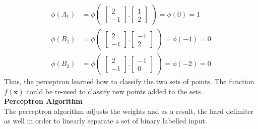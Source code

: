 \begin{align}
  \phi(A_1) &= \phi\begin{pmatrix}
    \begin{bmatrix}
      2\\
      -1
    \end{bmatrix}.\begin{bmatrix}
      1 \\
      2
    \end{bmatrix}
  \end{pmatrix} = \phi(0) = 1 \\
  \phi(B_1) &= \phi\begin{pmatrix}
    \begin{bmatrix}
      2\\
      -1
    \end{bmatrix}.\begin{bmatrix}
      -1 \\
      2
    \end{bmatrix}
  \end{pmatrix} = \phi(-4) = 0 \\
  \phi(B_2) &= \phi\begin{pmatrix}
    \begin{bmatrix}
      2\\
      -1
    \end{bmatrix}.\begin{bmatrix}
      -1 \\
      0
    \end{bmatrix}
  \end{pmatrix} = \phi(-2) = 0
\end{align}
Thus, the perceptron learned how to classify the two sets of points. The function $f(\textbf{x})$ could be re-used to classify new points added to the sets.
\vspace{5mm}
\\
\noindent\textbf{Perceptron Algorithm}\\
The perceptron algorithm adjusts the weights and as a result, the hard delimiter as well in order to linearly separate a set of binary labelled input.

